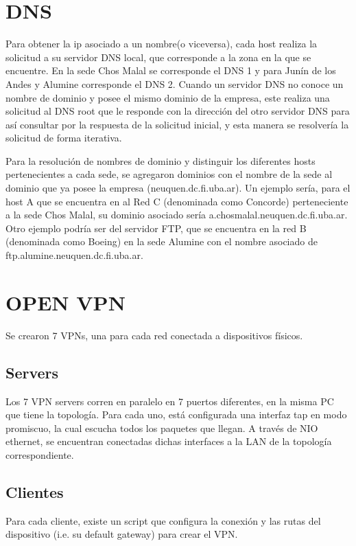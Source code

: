 \documentclass[12pt, a4paper, spanish]{article}
\begin{document}
\newpage


\newpage
\section{DNS}
Para obtener la ip asociado a un nombre(o viceversa), cada host realiza 
la solicitud a su servidor DNS local, que corresponde a la zona en la que 
se encuentre.
En la sede Chos Malal se corresponde el DNS 1 y para Junín de los Andes y 
Alumine corresponde el DNS 2.
Cuando un servidor DNS no conoce un nombre de dominio y posee el mismo 
dominio de la empresa, este realiza una solicitud al DNS root que le responde 
con la dirección del otro servidor DNS para así consultar por la respuesta de 
la solicitud inicial, y esta manera se resolvería la solicitud de forma 
iterativa.

Para la resolución de nombres de dominio y distinguir los diferentes hosts 
pertenecientes a cada sede, se agregaron dominios con el nombre de la sede 
al dominio que ya posee la empresa (neuquen.dc.fi.uba.ar).
Un ejemplo sería, para el host A que se encuentra en al Red C (denominada 
como Concorde) perteneciente a la sede Chos Malal, su dominio asociado sería 
a.chosmalal.neuquen.dc.fi.uba.ar.
Otro ejemplo podría ser del servidor FTP, que se encuentra en la red B 
(denominada como Boeing) en la sede Alumine con el nombre asociado de 
ftp.alumine.neuquen.dc.fi.uba.ar.

\section{OPEN VPN}
Se crearon 7 VPNs, una para cada red conectada a dispositivos físicos.

\subsection{Servers}
Los 7 VPN servers corren en paralelo en 7 puertos diferentes, en la misma PC 
que tiene la topología.
Para cada uno, está configurada una interfaz tap en modo promiscuo, la cual 
escucha todos los paquetes que llegan.
A través de NIO ethernet, se encuentran conectadas dichas interfaces a la LAN 
de la topología correspondiente.

\subsection{Clientes}
Para cada cliente, existe un script que configura la conexión y 
las rutas del dispositivo (i.e. su default gateway) para crear el VPN.
\end{document}

